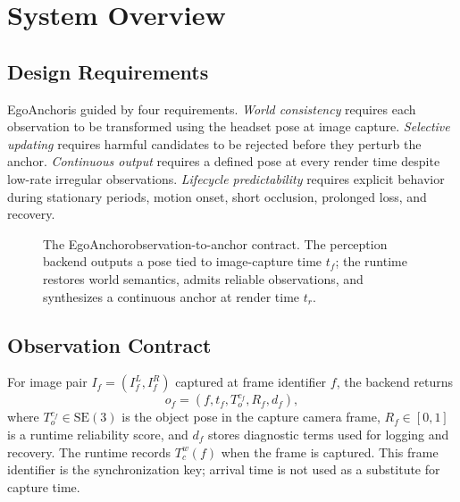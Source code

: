 \documentclass[review]{vgtc}
\newcommand{\system}{EgoAnchor}
\newcommand{\se}{\mathrm{SE}(3)}
\begin{document}
\section{System Overview}
\subsection{Design Requirements}
\system is guided by four requirements. \emph{World consistency} requires each observation to be transformed using the headset pose at image capture. \emph{Selective updating} requires harmful candidates to be rejected before they perturb the anchor. \emph{Continuous output} requires a defined pose at every render time despite low-rate irregular observations. \emph{Lifecycle predictability} requires explicit behavior during stationary periods, motion onset, short occlusion, prolonged loss, and recovery.

\begin{figure}[t]
\centering
{}
\caption{The \system observation-to-anchor contract. The perception backend outputs a pose tied to image-capture time $t_f$; the runtime restores world semantics, admits reliable observations, and synthesizes a continuous anchor at render time $t_r$.}
\label{fig:pipeline}
\end{figure}

\subsection{Observation Contract}
For image pair $I_f=(I_f^L,I_f^R)$ captured at frame identifier $f$, the backend returns
\begin{equation}
  o_f = \left(f, t_f, T_{o}^{c_f}, R_f, d_f\right),
\end{equation}
where $T_o^{c_f}\in\se$ is the object pose in the capture camera frame, $R_f\in[0,1]$ is a runtime reliability score, and $d_f$ stores diagnostic terms used for logging and recovery. The runtime records $T_c^w(f)$ when the frame is captured. This frame identifier is the synchronization key; arrival time is not used as a substitute for capture time.
\end{document}
